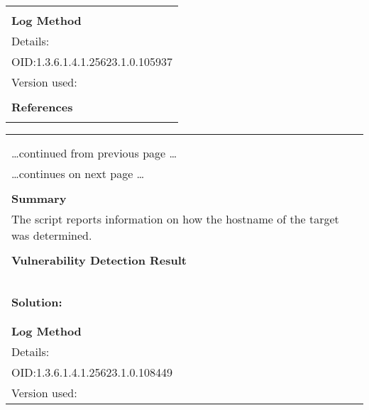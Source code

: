 \documentclass{article}
\begin{document}
\begin{longtable}{|p{}|}
        \hline
        \\
\textbf{Log Method}\\
Details:
\rowcolor{white}{\verb=OS Detection Consolidation and Reporting=}\\
OID:1.3.6.1.4.1.25623.1.0.105937\\
Version used:
\rowcolor{white}{\verb=2022-04-05T09:27:51Z=}\\

      \hline
      \\
\textbf{References}\\
\rowcolor{white}{\verb=url: https://community.greenbone.net/c/vulnerability-tests=}\\
\end{longtable}

\begin{longtable}{|p{}|}
\hline
\rowcolor{gvm_log}{\color{white}{Log (CVSS: 0.0) }}\\
\rowcolor{gvm_log}{\color{white}{NVT: Hostname Determination Reporting}}\\
\hline
\endfirsthead
\hfill\ldots continued from previous page \ldots \\
\hline
\endhead
\hline
\ldots continues on next page \ldots \\
\endfoot
\hline
\endlastfoot
\\
\textbf{Summary}\\
The script reports information on how the hostname
  of the target was determined.\\

        \hline
        \\
\textbf{Vulnerability Detection Result}\\
\rowcolor{white}{\verb=Hostname determination for IP 192.168.178.22:=}\\
\rowcolor{white}{\verb=Hostname|Source=}\\
\rowcolor{white}{\verb=homeprinter|SSL/TLS server certificate=}\\
\rowcolor{white}{\verb=homeprinter.fritz.box|Reverse-DNS=}\\

          \hline
          \\
\textbf{Solution:}\\
\\


        \hline
        \\
\textbf{Log Method}\\
Details:
\rowcolor{white}{\verb=Hostname Determination Reporting=}\\
OID:1.3.6.1.4.1.25623.1.0.108449\\
Version used:
\rowcolor{white}{\verb=2018-11-19T11:11:31Z=}\\
\end{longtable}
\end{document}
